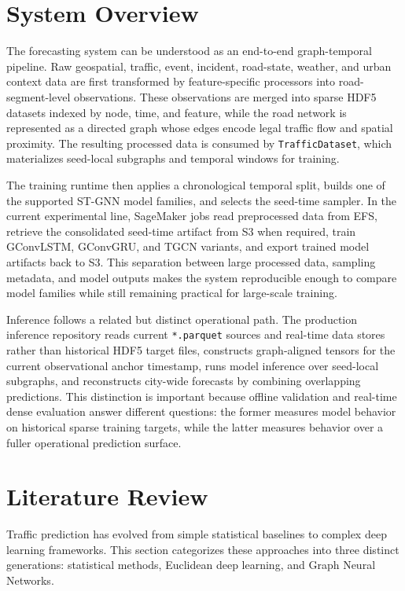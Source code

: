 \documentclass[11pt, a4paper]{article}
\begin{document}
\section{System Overview}

The forecasting system can be understood as an end-to-end graph-temporal pipeline. Raw geospatial, traffic, event, incident, road-state, weather, and urban context data are first transformed by feature-specific processors into road-segment-level observations. These observations are merged into sparse HDF5 datasets indexed by node, time, and feature, while the road network is represented as a directed graph whose edges encode legal traffic flow and spatial proximity. The resulting processed data is consumed by \texttt{TrafficDataset}, which materializes seed-local subgraphs and temporal windows for training.

The training runtime then applies a chronological temporal split, builds one of the supported ST-GNN model families, and selects the seed-time sampler. In the current experimental line, SageMaker jobs read preprocessed data from EFS, retrieve the consolidated seed-time artifact from S3 when required, train GConvLSTM, GConvGRU, and TGCN variants, and export trained model artifacts back to S3. This separation between large processed data, sampling metadata, and model outputs makes the system reproducible enough to compare model families while still remaining practical for large-scale training.

Inference follows a related but distinct operational path. The production inference repository reads current \texttt{*.parquet} sources and real-time data stores rather than historical HDF5 target files, constructs graph-aligned tensors for the current observational anchor timestamp, runs model inference over seed-local subgraphs, and reconstructs city-wide forecasts by combining overlapping predictions. This distinction is important because offline validation and real-time dense evaluation answer different questions: the former measures model behavior on historical sparse training targets, while the latter measures behavior over a fuller operational prediction surface.

\section{Literature Review}

Traffic prediction has evolved from simple statistical baselines to complex deep learning frameworks. This section categorizes these approaches into three distinct generations: statistical methods, Euclidean deep learning, and Graph Neural Networks.
\end{document}
